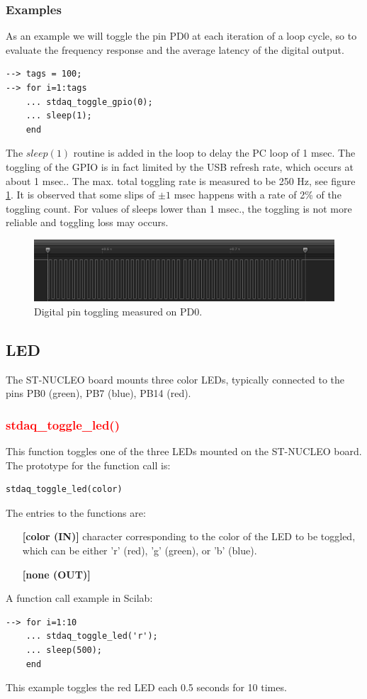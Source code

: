 \documentclass[letterpaper,10pt,english]{hitec}
\begin{document}
\subsubsection{Examples}

As an example we will toggle the pin PD0 at each iteration of a loop cycle, so to evaluate the frequency response and the average latency of the digital output.

\begin{verbatim}
--> tags = 100;
--> for i=1:tags
    ... stdaq_toggle_gpio(0);
    ... sleep(1);
    end
\end{verbatim}
The $sleep(1)$ routine is added in the loop to delay the PC loop of 1 msec. 
The toggling of the GPIO is in fact limited by the USB refresh rate, which occurs at about 1 msec..
The max. total toggling rate is measured to be 250 Hz, see figure \ref{fig:gpio_example}. It is observed that some slips of $\pm 1$ msec happens with a rate of 2\% of the toggling count. 
For values of sleeps lower than 1 msec., the toggling is not more reliable and toggling loss may occurs.

\begin{figure}[ht!]
\includegraphics[scale=0.8]{../img/gpio_example.png}
\caption{Digital pin toggling measured on PD0.}
\label{fig:gpio_example}
\end{figure}


\hrulefill

\subsection{LED}

The ST-NUCLEO board mounts three color LEDs, typically connected to the pins PB0 (green), PB7 (blue), PB14 (red).

\subsubsection{\textcolor{red}{stdaq\_toggle\_led()}}
This function toggles one of the three LEDs mounted on the ST-NUCLEO board.
The prototype for the function call is: 
\begin{verbatim}
stdaq_toggle_led(color)
\end{verbatim}
The entries to the functions are:
\begin{itemize}
\item [\textbf{[color (IN)]}] character corresponding to the color of the LED to be toggled, which can be either 'r' (red), 'g' (green), or 'b' (blue).
\item [\textbf{[none (OUT)]}]
\end{itemize}
A function call example in Scilab:
\begin{verbatim}
--> for i=1:10
    ... stdaq_toggle_led('r');
    ... sleep(500);
    end
\end{verbatim}
This example toggles the red LED each 0.5 seconds for 10 times.
\end{document}
